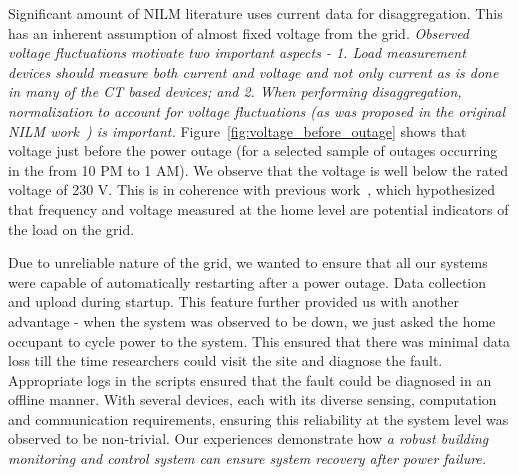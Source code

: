 \documentclass[10pt]{sensys-proc}
\newcommand{\redcolor}[1]{\textcolor{red}{#1}}
\newcommand{\figref}[1]{Figure~\ref{#1}}
\begin{document}
Significant amount of NILM literature uses current data
for disaggregation. This has an inherent assumption of almost fixed voltage from the grid. \emph{Observed voltage fluctuations motivate two important aspects - 1. Load measurement devices should measure both current and voltage and not only current as is done in many of the CT based devices; and 2. When performing disaggregation, normalization to account for voltage fluctuations (as was proposed in the original NILM work~\cite{hart}) is important.}
\figref{fig:voltage_before_outage} shows that voltage just before the power outage (for a selected sample of outages occurring in the  from 10 PM to 1 AM). We observe that the voltage is well below the rated voltage of 230 V. This is in coherence with previous work~\cite{nplug}, which hypothesized that frequency and voltage measured at the home level are potential indicators of the load on the grid.

\noindent Due to unreliable nature of the grid, we wanted to ensure that all our systems were capable of automatically restarting after a power outage. Data collection and upload during startup. This feature further provided us with another advantage - when the system was observed to be down, we just asked the home occupant to cycle power to the system. This ensured that there was minimal data loss till the time researchers could visit the site and diagnose the fault. Appropriate logs in the scripts ensured that the fault could be diagnosed in an offline manner.  With several devices, each with its diverse sensing, computation and communication requirements, ensuring this reliability at the system level was observed to be non-trivial. Our experiences demonstrate how \emph{a robust building monitoring and control system can ensure system recovery after power failure.}
\end{document}
